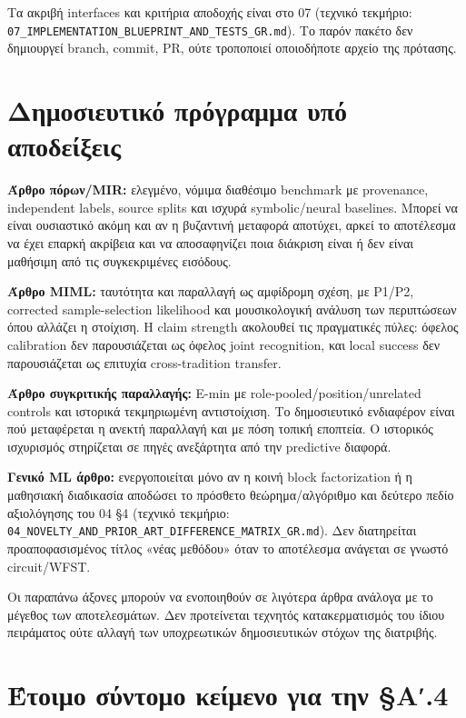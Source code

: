 \documentclass[
  10pt,
  a4paper,
]{report}
\begin{document}
Τα ακριβή interfaces και κριτήρια αποδοχής είναι στο 07 (τεχνικό
τεκμήριο: \texttt{07\_IMPLEMENTATION\_BLUEPRINT\_AND\_TESTS\_GR.md}). Το
παρόν πακέτο δεν δημιουργεί branch, commit, PR, ούτε τροποποιεί
οποιοδήποτε αρχείο της πρότασης.

\section{Δημοσιευτικό πρόγραμμα υπό
αποδείξεις}\label{ux3b4ux3b7ux3bcux3bfux3c3ux3b9ux3b5ux3c5ux3c4ux3b9ux3baux3cc-ux3c0ux3c1ux3ccux3b3ux3c1ux3b1ux3bcux3bcux3b1-ux3c5ux3c0ux3cc-ux3b1ux3c0ux3bfux3b4ux3b5ux3afux3beux3b5ux3b9ux3c2}

\textbf{Άρθρο πόρων/MIR:} ελεγμένο, νόμιμα διαθέσιμο benchmark με
provenance, independent labels, source splits και ισχυρά symbolic/neural
baselines. Μπορεί να είναι ουσιαστικό ακόμη και αν η βυζαντινή μεταφορά
αποτύχει, αρκεί το αποτέλεσμα να έχει επαρκή ακρίβεια και να
αποσαφηνίζει ποια διάκριση είναι ή δεν είναι μαθήσιμη από τις
συγκεκριμένες εισόδους.

\textbf{Άρθρο MIML:} ταυτότητα και παραλλαγή ως αμφίδρομη σχέση, με
P1/P2, corrected sample-selection likelihood και μουσικολογική ανάλυση
των περιπτώσεων όπου αλλάζει η στοίχιση. Η claim strength ακολουθεί τις
πραγματικές πύλες: όφελος calibration δεν παρουσιάζεται ως όφελος joint
recognition, και local success δεν παρουσιάζεται ως επιτυχία
cross-tradition transfer.

\textbf{Άρθρο συγκριτικής παραλλαγής:} E-min με
role-pooled/position/unrelated controls και ιστορικά τεκμηριωμένη
αντιστοίχιση. Το δημοσιευτικό ενδιαφέρον είναι πού μεταφέρεται η ανεκτή
παραλλαγή και με πόση τοπική εποπτεία. Ο ιστορικός ισχυρισμός στηρίζεται
σε πηγές ανεξάρτητα από την predictive διαφορά.

\textbf{Γενικό ML άρθρο:} ενεργοποιείται μόνο αν η κοινή block
factorization ή η μαθησιακή διαδικασία αποδώσει το πρόσθετο
θεώρημα/αλγόριθμο και δεύτερο πεδίο αξιολόγησης του 04 §4 (τεχνικό
τεκμήριο:
\texttt{04\_NOVELTY\_AND\_PRIOR\_ART\_DIFFERENCE\_MATRIX\_GR.md}). Δεν
διατηρείται προαποφασισμένος τίτλος «νέας μεθόδου» όταν το αποτέλεσμα
ανάγεται σε γνωστό circuit/WFST.

Οι παραπάνω άξονες μπορούν να ενοποιηθούν σε λιγότερα άρθρα ανάλογα με
το μέγεθος των αποτελεσμάτων. Δεν προτείνεται τεχνητός κατακερματισμός
του ίδιου πειράματος ούτε αλλαγή των υποχρεωτικών δημοσιευτικών στόχων
της διατριβής.

\section{Έτοιμο σύντομο κείμενο για την
§Αʹ.4}\label{ux3adux3c4ux3bfux3b9ux3bcux3bf-ux3c3ux3cdux3bdux3c4ux3bfux3bcux3bf-ux3baux3b5ux3afux3bcux3b5ux3bdux3bf-ux3b3ux3b9ux3b1-ux3c4ux3b7ux3bd-ux3b1ux2b9.4}
\end{document}
